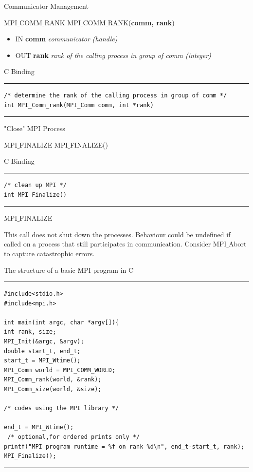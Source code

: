 \documentclass[xcolor=dvipsnames]{beamer}
\begin{document}
\begin{frame}[fragile]{Communicator Management}
\begin{block}{MPI$\_$COMM$\_$RANK}
MPI$\_$COMM$\_$RANK(\textbf{comm, rank})
\\
\begin{itemize}
\item[] IN \textbf{comm} \: \textit{communicator (handle)}\\
\item[] OUT \textbf{rank} \: \textit{rank of the calling process in group of comm (integer)}\\
\end{itemize}
\end{block}

C Binding
\rule{\textwidth}{1pt}
\scriptsize
\begin{verbatim}
/* determine the rank of the calling process in group of comm */
int MPI_Comm_rank(MPI_Comm comm, int *rank)
\end{verbatim}
\rule{\textwidth}{1pt}
\end{frame}





\begin{frame}[fragile]{"Close" MPI Process}
\begin{block}{MPI$\_$FINALIZE}
MPI$\_$FINALIZE()
\end{block}

C Binding
\rule{\textwidth}{1pt}
\scriptsize
\begin{verbatim}
/* clean up MPI */
int MPI_Finalize()
\end{verbatim}
\rule{\textwidth}{1pt}
\end{frame}

\begin{frame}{MPI$\_$FINALIZE}
\begin{outline}
\1 This call does not shut down the processes.
\2 Behaviour could be undefined if called on a process that still participates in communication.
\2 Consider MPI$\_$Abort to capture catastrophic errors.
\end{outline}
\end{frame}


\begin{frame}[fragile]{The structure of a basic MPI program in C}
\rule{\textwidth}{1pt}
\scriptsize
\begin{verbatim}
#include<stdio.h>
#include<mpi.h>

int main(int argc, char *argv[]){
int rank, size;
MPI_Init(&argc, &argv);
double start_t, end_t;
start_t = MPI_Wtime();
MPI_Comm world = MPI_COMM_WORLD;
MPI_Comm_rank(world, &rank);
MPI_Comm_size(world, &size);

/* codes using the MPI library */

end_t = MPI_Wtime();
 /* optional,for ordered prints only */ 
printf("MPI program runtime = %f on rank %d\n", end_t-start_t, rank);
MPI_Finalize();
\end{verbatim}
\rule{\textwidth}{1pt}
\end{frame}
\end{document}
